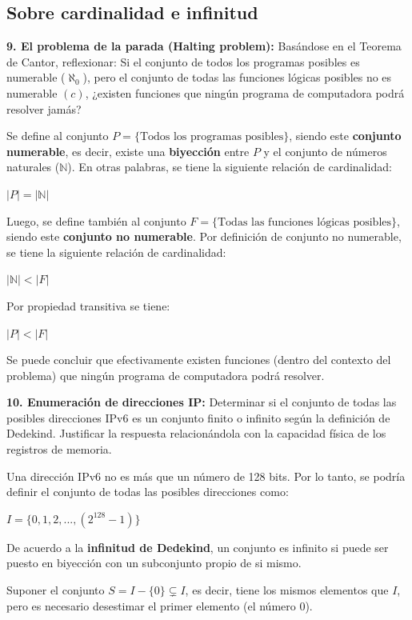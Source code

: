 \documentclass{article}
\begin{document}
\subsection{Sobre cardinalidad e infinitud}

\textbf{9. El problema de la parada (Halting problem):} Basándose en el Teorema de Cantor, reflexionar: Si el conjunto de todos los programas posibles es numerable ($\aleph_0$), pero el conjunto de todas las funciones lógicas posibles no es numerable $(c)$, ¿existen funciones que ningún programa de computadora podrá resolver jamás?

Se define al conjunto $P = \{\text{Todos los programas posibles}\}$, siendo este \textbf{conjunto numerable}, es decir, existe una \textbf{biyección} entre $P$ y el conjunto de números naturales ($\mathbb{N}$). En otras palabras, se tiene la siguiente relación de cardinalidad:

$\left|P\right| = \left|\mathbb{N}\right|$

Luego, se define también al conjunto $F = \{\text{Todas las funciones lógicas posibles}\}$, siendo este \textbf{conjunto no numerable}. Por definición de conjunto no numerable, se tiene la siguiente relación de cardinalidad:

$\left|\mathbb{N}\right| < \left|F\right|$

Por propiedad transitiva se tiene:

$\left|P\right| < \left|F\right|$

Se puede concluir que efectivamente existen funciones (dentro del contexto del problema) que ningún programa de computadora podrá resolver.

\textbf{10. Enumeración de direcciones IP:} Determinar si el conjunto de todas las posibles direcciones IPv6 es un conjunto finito o infinito según la definición de Dedekind. Justificar la respuesta relacionándola con la capacidad física de los registros de memoria.

Una dirección IPv6 no es más que un número de 128 bits. Por lo tanto, se podría definir el conjunto de todas las posibles direcciones como:

$I = \{0, 1, 2, ..., (2^{128} - 1)\}$

De acuerdo a la \textbf{infinitud de Dedekind}, un conjunto es infinito si puede ser puesto en biyección con un subconjunto propio de si mismo.

Suponer el conjunto $S = I - \{0\} \subsetneq I$, es decir, tiene los mismos elementos que $I$, pero es necesario desestimar el primer elemento (el número $0$).
\end{document}
